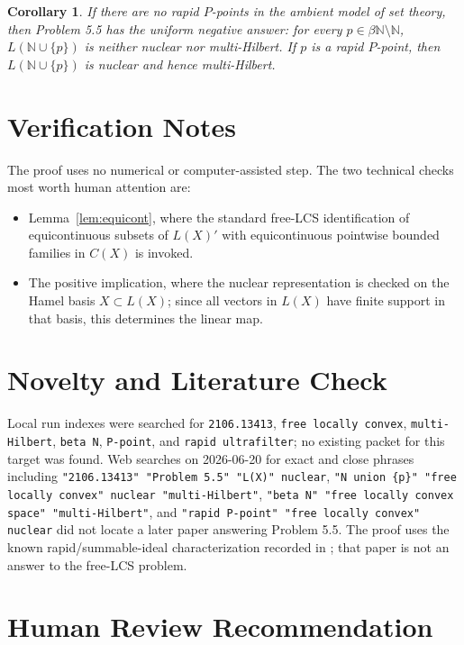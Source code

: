 \documentclass[11pt]{article}
\newtheorem{corollary}{Corollary}
\newcommand{\N}{\mathbb N}
\begin{document}
\begin{corollary}
If there are no rapid \(P\)-points in the ambient model of set theory, then
Problem 5.5 has the uniform negative answer: for every
\(p\in\beta\N\setminus\N\), \(L(\N\cup\{p\})\) is neither nuclear nor
multi-Hilbert. If \(p\) is a rapid \(P\)-point, then
\(L(\N\cup\{p\})\) is nuclear and hence multi-Hilbert.
\end{corollary}

\section*{Verification Notes}

The proof uses no numerical or computer-assisted step. The two technical
checks most worth human attention are:
\begin{itemize}
\item Lemma~\ref{lem:equicont}, where the standard free-LCS identification of
equicontinuous subsets of \(L(X)'\) with equicontinuous pointwise bounded
families in \(C(X)\) is invoked.
\item The positive implication, where the nuclear representation is checked on
the Hamel basis \(X\subset L(X)\); since all vectors in \(L(X)\) have finite
support in that basis, this determines the linear map.
\end{itemize}

\section*{Novelty and Literature Check}

Local run indexes were searched for \texttt{2106.13413}, \texttt{free locally
convex}, \texttt{multi-Hilbert}, \texttt{beta N}, \texttt{P-point}, and
\texttt{rapid ultrafilter}; no existing packet for this target was found. Web
searches on 2026-06-20 for exact and close phrases including
\texttt{"2106.13413" "Problem 5.5" "L(X)" nuclear},
\texttt{"N union \{p\}" "free locally convex" nuclear "multi-Hilbert"},
\texttt{"beta N" "free locally convex space" "multi-Hilbert"}, and
\texttt{"rapid P-point" "free locally convex" nuclear} did not locate a later paper
answering Problem 5.5. The proof uses the known rapid/summable-ideal
characterization recorded in \cite{Flaskova}; that paper is not an answer to
the free-LCS problem.

\section*{Human Review Recommendation}
\end{document}
